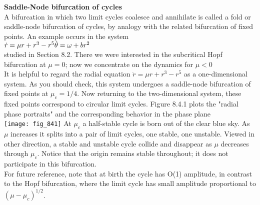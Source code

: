 \documentclass{article}
\newcommand\tab[1][1cm]{\hspace*{#1}}
\begin{document}
\textbf {Saddle-Node bifurcation of cycles} \\ \tab
A bifurcation in which two limit cycles coalesce and annihilate is called a fold or saddle-node bifurcation of cycles, by analogy with the related bifurcation of fixed points. An example occurs in the system \\ \tab \tab
$\dot{r}=\mu r + r^{3}-r^{5} \\
\dot{\theta}=\omega +br^{2}$ \\
studied in Section 8.2. There we were interested in the subcritical Hopf bifurcation at $\mu=0$; now we concentrate on the dynamics for $\mu < 0$ \\ \tab
It is helpful to regard the radial equation $\dot{r}=\mu r + r^{3}-r^{5}$ as a one-dimensional system. As you should check, this system undergoes a saddle-node bifurcation of fixed points at $\mu_{c}=1/4$. Now returning to the two-dimensional system, these fixed points correspond to circular limit cycles. Figure 8.4.1 plots the "radial phase portraits" and the corresponding behavior in the phase plane \\
\texttt{[image: fig\_841]}
At $\mu_{c}$ a half-stable cycle is born out of the clear blue sky. As $\mu$ increases it splits into a pair of limit cycles, one stable, one unstable. Viewed in other direction, a stable and unstable cycle collide and disappear as $\mu$ decreases through $\mu_{c}$. Notice that the origin remains stable throughout; it does not participate in this bifurcation.
\\ \tab
For future reference, note that at birth the cycle has O(1) amplitude, in contrast to the Hopf bifurcation, where the limit cycle has small amplitude proportional to $(\mu - \mu_{c})^{1/2}$. 
\end{document}
